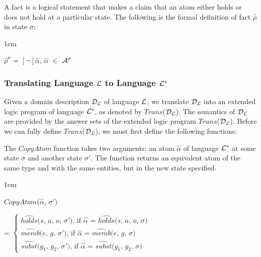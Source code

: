 \documentclass[global,twocolumn,final]{svjour}
\newenvironment{vquote}
  {\begin{list}{}{\leftmargin 1em}\item[]}
  {\end{list}}
\begin{document}
          A fact is a logical statement that makes a claim that an atom either
          holds or does not hold at a particular state. The following is the
          formal definition of fact $\hat{\rho}$ in state $\sigma$:

          \begin{vquote}
            $\hat{\rho}^{\sigma}$ =
            $[\lnot]$$\hat{\alpha}$, $\hat{\alpha}$ $\in$ ${\cal A}^{\sigma}$
          \end{vquote}

      \subsubsection{Translating Language ${\cal L}$ to Language ${\cal L^{*}}$}

        Given a domain description ${\cal D_{L}}$ of language ${\cal L}$, we
        translate ${\cal D_{L}}$ into an extended logic program of language
        ${\cal L^{*}}$, as denoted by $Trans$(${\cal D_{L}}$). The semantics of
        ${\cal D_{L}}$ are provided by the answer sets of the extended logic
        program $Trans$(${\cal D_{L}}$). Before we can fully define
        $Trans$(${\cal D}_{\cal L}$), we must first define the following
        functions:

        The $CopyAtom$ function takes two arguments: an atom $\hat{\alpha}$
        of language ${\cal L}^{*}$ at some state $\sigma$ and another state
        $\sigma'$. The function returns an equivalent atom of the same type
        and with the same entities, but in the new state specified.

        \begin{vquote}
          $CopyAtom$($\hat{\alpha}$, $\sigma'$)

          \hspace{1em}
          =
          \begin{math}
            \begin{cases}
              \mbox{$\hat{holds}$($s$, $a$, $o$, $\sigma'$), if $\hat{\alpha}$ = $\hat{holds}$($s$, $a$, $o$, $\sigma$)} \\
              \mbox{$\hat{memb}$($e$, $g$, $\sigma'$), if $\hat{\alpha}$ = $\hat{memb}$($e$, $g$, $\sigma$)} \\
              \mbox{$\hat{subst}$($g_{1}$, $g_{2}$, $\sigma'$), if $\hat{\alpha}$ = $\hat{subst}$($g_{1}$, $g_{2}$, $\sigma$)}
            \end{cases}
          \end{math}
        \end{vquote}
\end{document}
